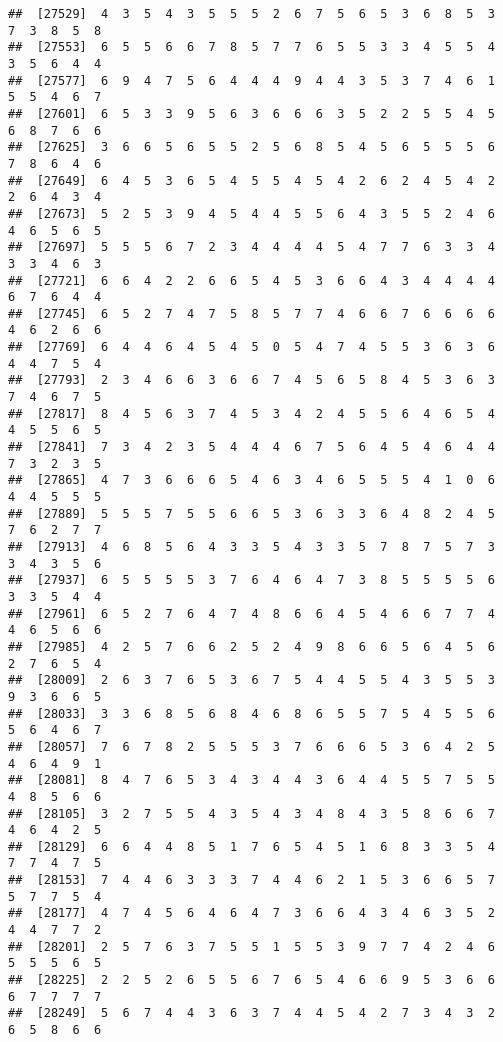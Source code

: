 \documentclass[
]{book}
\begin{document}
\begin{verbatim}
##  [27529]  4  3  5  4  3  5  5  5  2  6  7  5  6  5  3  6  8  5  3  7  3  8  5  8
##  [27553]  6  5  5  6  6  7  8  5  7  7  6  5  5  3  3  4  5  5  4  3  5  6  4  4
##  [27577]  6  9  4  7  5  6  4  4  4  9  4  4  3  5  3  7  4  6  1  5  5  4  6  7
##  [27601]  6  5  3  3  9  5  6  3  6  6  6  3  5  2  2  5  5  4  5  6  8  7  6  6
##  [27625]  3  6  6  5  6  5  5  2  5  6  8  5  4  5  6  5  5  5  6  7  8  6  4  6
##  [27649]  6  4  5  3  6  5  4  5  5  4  5  4  2  6  2  4  5  4  2  2  6  4  3  4
##  [27673]  5  2  5  3  9  4  5  4  4  5  5  6  4  3  5  5  2  4  6  4  6  5  6  5
##  [27697]  5  5  5  6  7  2  3  4  4  4  4  5  4  7  7  6  3  3  4  3  3  4  6  3
##  [27721]  6  6  4  2  2  6  6  5  4  5  3  6  6  4  3  4  4  4  4  6  7  6  4  4
##  [27745]  6  5  2  7  4  7  5  8  5  7  7  4  6  6  7  6  6  6  6  4  6  2  6  6
##  [27769]  6  4  4  6  4  5  4  5  0  5  4  7  4  5  5  3  6  3  6  4  4  7  5  4
##  [27793]  2  3  4  6  6  3  6  6  7  4  5  6  5  8  4  5  3  6  3  7  4  6  7  5
##  [27817]  8  4  5  6  3  7  4  5  3  4  2  4  5  5  6  4  6  5  4  4  5  5  6  5
##  [27841]  7  3  4  2  3  5  4  4  4  6  7  5  6  4  5  4  6  4  4  7  3  2  3  5
##  [27865]  4  7  3  6  6  6  5  4  6  3  4  6  5  5  5  4  1  0  6  4  4  5  5  5
##  [27889]  5  5  5  7  5  5  6  6  5  3  6  3  3  6  4  8  2  4  5  7  6  2  7  7
##  [27913]  4  6  8  5  6  4  3  3  5  4  3  3  5  7  8  7  5  7  3  3  4  3  5  6
##  [27937]  6  5  5  5  5  3  7  6  4  6  4  7  3  8  5  5  5  5  6  3  3  5  4  4
##  [27961]  6  5  2  7  6  4  7  4  8  6  6  4  5  4  6  6  7  7  4  4  6  5  6  6
##  [27985]  4  2  5  7  6  6  2  5  2  4  9  8  6  6  5  6  4  5  6  2  7  6  5  4
##  [28009]  2  6  3  7  6  5  3  6  7  5  4  4  5  5  4  3  5  5  3  9  3  6  6  5
##  [28033]  3  3  6  8  5  6  8  4  6  8  6  5  5  7  5  4  5  5  6  5  6  4  6  7
##  [28057]  7  6  7  8  2  5  5  5  3  7  6  6  6  5  3  6  4  2  5  4  6  4  9  1
##  [28081]  8  4  7  6  5  3  4  3  4  4  3  6  4  4  5  5  7  5  5  4  8  5  6  6
##  [28105]  3  2  7  5  5  4  3  5  4  3  4  8  4  3  5  8  6  6  7  4  6  4  2  5
##  [28129]  6  6  4  4  8  5  1  7  6  5  4  5  1  6  8  3  3  5  4  7  7  4  7  5
##  [28153]  7  4  4  6  3  3  3  7  4  4  6  2  1  5  3  6  6  5  7  5  7  7  5  4
##  [28177]  4  7  4  5  6  4  6  4  7  3  6  6  4  3  4  6  3  5  2  4  4  7  7  2
##  [28201]  2  5  7  6  3  7  5  5  1  5  5  3  9  7  7  4  2  4  6  5  5  5  6  5
##  [28225]  2  2  5  2  6  5  5  6  7  6  5  4  6  6  9  5  3  6  6  6  7  7  7  7
##  [28249]  5  6  7  4  4  3  6  3  7  4  4  5  4  2  7  3  4  3  2  6  5  8  6  6

\end{verbatim}
\end{document}
